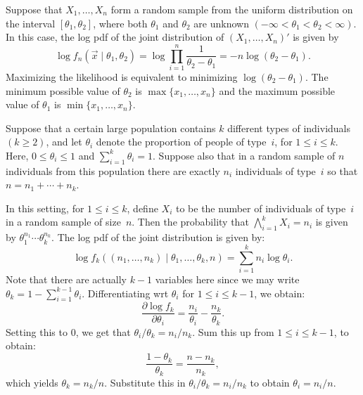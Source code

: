 \begin{example}\label{ex:stats:uniform}
Suppose that $X_1, \ldots, X_n$ form a random sample from the uniform distribution
on the interval $[\theta_1, \theta_2]$, where both $\theta_1$ and $\theta_2$ 
are unknown $(-\infty < \theta_1 < \theta_2 < \infty)$. In this case, the 
log pdf of the joint distribution of $(X_1, \ldots, X_n)'$ is given by
\[
    \log f_n (\vec{x} \mid \theta_1, \theta_2) 
    = \log \prod_{i = 1}^n \frac{1}{\theta_2 - \theta_1}    
    = - n \log (\theta_2 - \theta_1).
\]
Maximizing the likelihood is equivalent to minimizing $\log (\theta_2 - \theta_1)$.
The minimum possible value of $\theta_2$ is $\max \{x_1, \ldots, x_n\}$
and the maximum possible value of $\theta_1$ is $\min \{x_1, \ldots, x_n\}$.
\end{example}

\begin{example}
Suppose that a certain large population contains $k$ different types of 
individuals $(k \geq 2)$, and let $\theta_i$ denote the proportion of people 
of type~$i$, for $1 \leq i \leq k$. Here, $0 \leq \theta_i \leq 1$ and 
$\sum_{i = 1}^k \theta_i = 1$. Suppose also that in a random sample of $n$ 
individuals from this population there are exactly $n_i$ individuals of type~$i$
so that $n = n_1 + \cdots + n_k$.

In this setting, for $1 \leq i \leq k$, define $X_i$ to be the number of 
individuals of type~$i$ in a random sample of size~$n$. Then the probability 
that $\bigwedge_{i = 1}^k X_i = n_i$ is given by $\theta_1^{n_1} \cdots \theta_k^{n_k}$.  
The log pdf of the joint distribution is given by:
\[
    \log f_k((n_1, \ldots, n_k) \mid \theta_1, \ldots, \theta_k, n) 
        = \sum_{i = 1}^k n_i \log \theta_i. 
\] 
Note that there are actually $k - 1$ variables here since we may write 
$\theta_k = 1 - \sum_{i = 1}^{k - 1} \theta_i$. Differentiating wrt $\theta_i$
for $1 \leq i \leq k - 1$, we obtain:
\[
    \frac{\partial \log f_k}{\partial \theta_i} 
        = \frac{n_i}{\theta_i} - \frac{n_k}{\theta_k}. 
\]
Setting this to $0$, we get that $\theta_i / \theta_k = n_i / n_k$. Sum this up
from $1 \leq i \leq k - 1$, to obtain:
\[
    \frac{1 - \theta_k}{\theta_k} = \frac{n - n_k}{n_k},
\] 
which yields $\theta_k = n_k / n$. Substitute this in $\theta_i / \theta_k = n_i / n_k$
to obtain $\theta_i = n_i / n$.
\end{example} 

